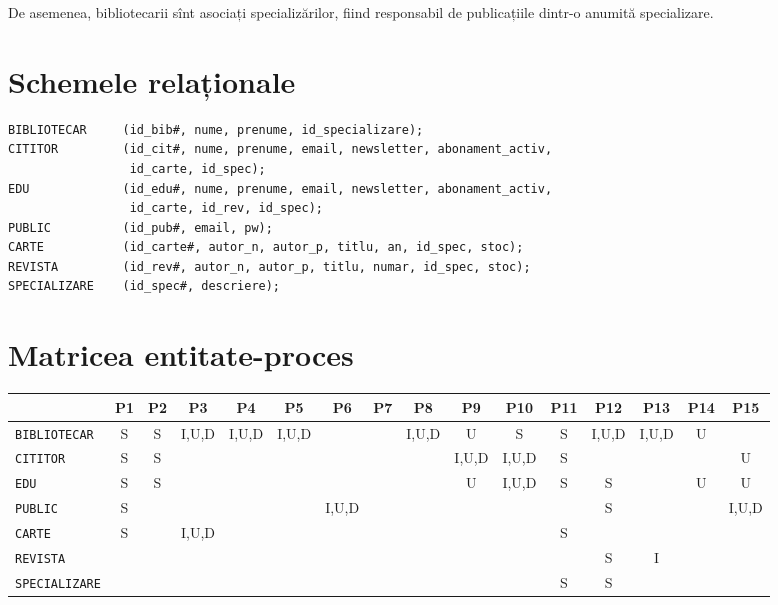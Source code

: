 De asemenea, bibliotecarii sînt asociați specializărilor, fiind
responsabil de publicațiile dintr-o anumită specializare.



\section{Schemele relaționale}
\label{sec:scheme-rel}

\begin{verbatim}
BIBLIOTECAR     (id_bib#, nume, prenume, id_specializare);
CITITOR         (id_cit#, nume, prenume, email, newsletter, abonament_activ,
                 id_carte, id_spec);
EDU             (id_edu#, nume, prenume, email, newsletter, abonament_activ,
                 id_carte, id_rev, id_spec);
PUBLIC          (id_pub#, email, pw);
CARTE           (id_carte#, autor_n, autor_p, titlu, an, id_spec, stoc);
REVISTA         (id_rev#, autor_n, autor_p, titlu, numar, id_spec, stoc);
SPECIALIZARE    (id_spec#, descriere);
\end{verbatim}



\section{Matricea entitate-proces}
\label{sec:matr-ep}

\begin{center}
  \footnotesize
  \begin{tabular}{|l|c|c|c|c|c|c|c|c|c|c|c|c|c|c|c|}
    \hline
    & P1 & P2 & P3 & P4 & P5 & P6 & P7 & P8 & P9 & P10 & P11 & P12 & P13 & P14 & P15\\
    \hline \hline
    \texttt{BIBLIOTECAR} & S & S & I,U,D & I,U,D & I,U,D & & & I,U,D & U & S & S & I,U,D & I,U,D & U & \\
    \hline
    \texttt{CITITOR} & S & S & & & & & & & I,U,D & I,U,D & S & & & & U \\
    \hline
    \texttt{EDU} & S & S & & & & & & & U & I,U,D & S & S & & U & U \\
    \hline
    \texttt{PUBLIC} & S & & & & & I,U,D & & & & & & S & & & I,U,D \\
    \hline
    \texttt{CARTE} & S & & I,U,D & & & & & & & & S & & & & \\
    \hline
    \texttt{REVISTA} & & & & & & & & & & & & S & I & & \\
    \hline
    \texttt{SPECIALIZARE} & & & & & & & & & & & S & S & & & \\
    \hline
  \end{tabular}
\end{center}


